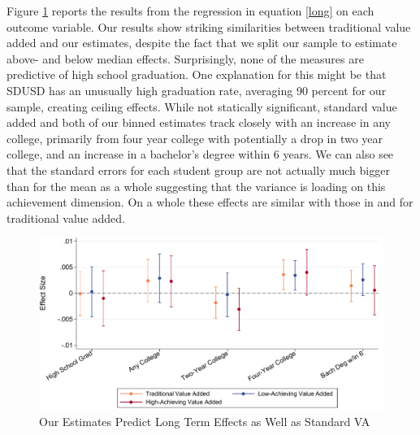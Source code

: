 \documentclass[12pt]{article}
\theoremstyle{definition}
\theoremstyle{definition}
\theoremstyle{definition}
\theoremstyle{definition}
\begin{document}
Figure \ref{fig:robust3} reports the results from the regression in equation \ref{long} on each outcome variable. Our results show striking similarities between traditional value added and our estimates, despite the fact that we split our sample to estimate above- and below median effects. Surprisingly, none of the measures are predictive of high school graduation. One explanation for this might be that SDUSD has an unusually high graduation rate, averaging 90 percent for our sample, creating ceiling effects. While not statically significant, standard value added and both of our binned estimates track closely with an increase in any college, primarily from four year college with potentially a drop in two year college, and an increase in a bachelor's degree within 6 years. We can also see that the standard errors for each student group are not actually much bigger than for the mean as a whole suggesting that the variance is loading on this achievement dimension. On a whole these effects are similar with those in \citet{chetty2014measuring2} and \citet{pope} for traditional value added. 


\begin{figure}[hbtp]
\centering
\includegraphics[width=.9\textwidth]{Working_Paper/WP_Figures/fig2b_longterm.pdf}
    \caption{Our Estimates Predict Long Term Effects as Well as Standard VA}
    \label{fig:robust3}
\end{figure}
\end{document}
